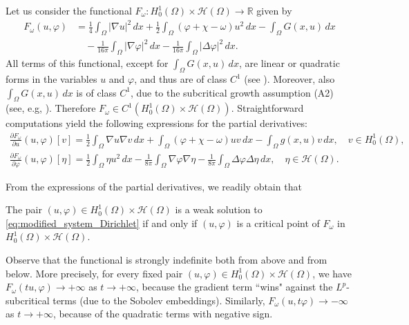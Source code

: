 \documentclass[reqno]{amsart}
\begin{document}
Let us consider the functional $F_\omega: H_0^1(\Omega) \times \mathcal{H}(\Omega) \to \mathbb R$ given by
\begin{align*}
 F_\omega(u, \varphi)
 & = \frac{1}{4} \int_\Omega |\nabla u|^2 \,dx 
 + \frac{1}{2} \int_\Omega (\varphi + \chi - \omega) u^2 \,dx 
 - \int_\Omega G(x, u) \,dx  \\
 & \quad - \frac{1}{16 \pi} \int_\Omega |\nabla \varphi|^2 \,dx 
 - \frac{1}{16 \pi} \int_\Omega |\Delta \varphi|^2 \,dx.
\end{align*}
All terms of this functional, except for $\int_\Omega G(x, u) \,dx$, are linear 
or quadratic forms in the variables $u$ and $\varphi$, and thus are of class 
$C^1$ (see \cite{BadialeSerra2011}). Moreover, also $\int_\Omega G(x, u) \,dx$ 
is of class $C^1$, due to the subcritical growth assumption (A2)
(see, e.g, \cite[Appendix B]{Rabinowitz1986}). 
Therefore $F_\omega \in C^1(H_0^1(\Omega) \times \mathcal{H}(\Omega))$.
Straightforward computations yield the following expressions for the partial 
derivatives:
\begin{gather}
  \frac{\partial F_\omega}{\partial u}(u, \varphi)[v] 
 = \frac{1}{2} \int_\Omega \nabla u \nabla v \,dx 
  + \int_\Omega (\varphi + \chi - \omega) u v \,dx 
  - \int_\Omega g(x, u) v \,dx, \quad v \in H_0^1(\Omega), \label{eq:F_u} \\
  \frac{\partial F_\omega}{\partial \varphi}(u, \varphi)[\eta] = \frac{1}{2} 
  \int_\Omega \eta u^2 \,dx - \frac{1}{8\pi} \int_\Omega \nabla \varphi \nabla \eta 
  - \frac{1}{8\pi} \int_\Omega \Delta \varphi \Delta \eta \,dx, \quad \eta \in \mathcal{H}(\Omega). \label{eq:F_varphi}
\end{gather}

From the expressions of the partial derivatives, we readily obtain that

\begin{proposition}
 \label{prop:variational_formulation_Dirichlet}
 The pair $(u, \varphi) \in H_0^1(\Omega) \times \mathcal{H}(\Omega) $ is a weak solution to
\eqref{eq:modified_system_Dirichlet} if and only if $(u, \varphi)$ is a critical point 
of $F_\omega$ in $H_0^1(\Omega) \times \mathcal{H}(\Omega) $.
\end{proposition}

Observe that the functional is strongly indefinite both from above and from below. 
More precisely, for every fixed pair $(u, \varphi) \in H_0^1(\Omega) \times \mathcal{H}(\Omega) $, we
have $F_\omega(tu, \varphi) \to + \infty$ as $t \to + \infty$, because the gradient 
term ``wins" against the $L^p$-subcritical terms (due to the Sobolev embeddings). 
Similarly, $F_\omega(u, t \varphi) \to - \infty$ as $t \to + \infty$, because of the 
quadratic terms with negative sign.
\end{document}
